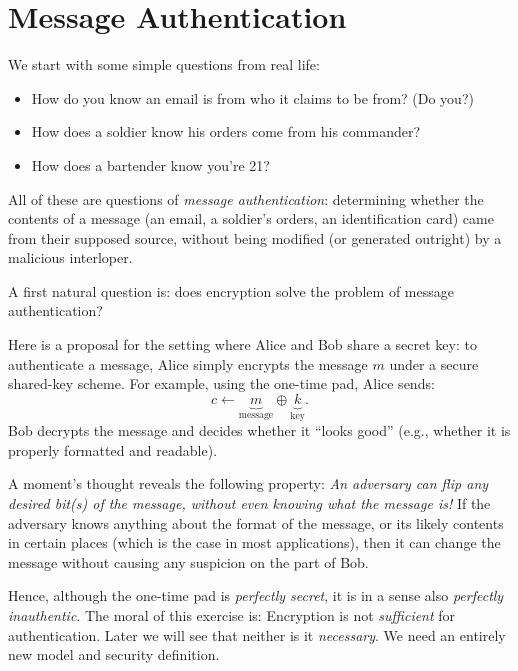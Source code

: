 \documentclass[11pt]{article}
\begin{document}
\thispagestyle{fancy}           %


\section{Message Authentication}
\label{sec:mess-auth}

We start with some simple questions from real life:
\begin{itemize}
\item How do you know an email is from who it claims to be from?  (Do
  you?)
\item How does a soldier know his orders come from his commander?
\item How does a bartender know you're 21?
\end{itemize}
All of these are questions of \emph{message authentication}:
determining whether the contents of a message (an email, a soldier's
orders, an identification card) came from their supposed source,
without being modified (or generated outright) by a malicious
interloper.

A first natural question is: does encryption solve the problem of
message authentication?

Here is a proposal for the setting where Alice and Bob share a secret
key: to authenticate a message, Alice simply encrypts the message $m$
under a secure shared-key scheme.  For example, using the one-time
pad, Alice sends: \[ c \gets \underbrace{m}_{\text{message}} \oplus
\underbrace{k}_{\text{key}}. \] Bob decrypts the message and decides
whether it ``looks good'' (e.g., whether it is properly formatted and
readable).

A moment's thought reveals the following property: \emph{An adversary
  can flip any desired bit(s) of the message, without even knowing
  what the message is!}  If the adversary knows anything about the
format of the message, or its likely contents in certain places (which
is the case in most applications), then it can change the message
without causing any suspicion on the part of Bob.

Hence, although the one-time pad is \emph{perfectly secret}, it is in
a sense also \emph{perfectly inauthentic}.  The moral of this exercise
is: Encryption is not \emph{sufficient} for authentication.  Later we
will see that neither is it \emph{necessary}.  We need an entirely new
model and security definition.
\end{document}
